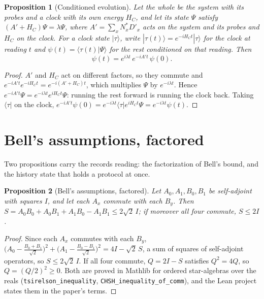 \documentclass[aps,prd,reprint,superscriptaddress]{revtex4-2}
\newtheorem{proposition}{Proposition}
\begin{document}
\begin{proposition}[Conditioned evolution]\label{prop:conditioned}
Let the whole be the system with its probes and a clock with its own energy $H_C$, and let its state $\Psi$ satisfy $(A' + H_C)\Psi = \lambda\Psi$, where $A' = \sum_x N^*_x D'_x$ acts on the system and its probes and $H_C$ on the clock. For a clock state $|\tau\rangle$, write $|\tau(t)\rangle = e^{-iH_C t}|\tau\rangle$ for the clock at reading $t$ and $\psi(t) = \langle \tau(t)|\Psi\rangle$ for the rest conditioned on that reading. Then
\begin{equation}
  \psi(t) = e^{i\lambda t}\, e^{-iA't}\, \psi(0).
  \label{eq:conditioned}
\end{equation}
\end{proposition}
\begin{proof}
$A'$ and $H_C$ act on different factors, so they commute and $e^{-iA't}e^{-iH_Ct} = e^{-i(A' + H_C)t}$, which multiplies $\Psi$ by $e^{-i\lambda t}$. Hence $e^{-iA't}\Psi = e^{-i\lambda t}e^{iH_Ct}\Psi$: running the rest forward is running the clock back. Taking $\langle\tau|$ on the clock, $e^{-iA't}\psi(0) = e^{-i\lambda t}\langle\tau|e^{iH_Ct}\Psi = e^{-i\lambda t}\psi(t)$.
\end{proof}

\section{Bell's assumptions, factored}
\label{app:bell}

Two propositions carry the records reading: the factorization of Bell's bound, and the history state that holds a protocol at once.

\begin{proposition}[Bell's assumptions, factored]\label{prop:factorization}
Let $A_0, A_1, B_0, B_1$ be self-adjoint with squares $I$, and let each $A_x$ commute with each $B_y$. Then $S = A_0B_0 + A_0B_1 + A_1B_0 - A_1B_1 \le 2\sqrt 2\, I$; if moreover all four commute, $S \le 2I$.
\end{proposition}
\begin{proof}
Since each $A_x$ commutes with each $B_y$, $\big(A_0 - \tfrac{B_0 + B_1}{\sqrt 2}\big)^2 + \big(A_1 - \tfrac{B_0 - B_1}{\sqrt 2}\big)^2 = 4I - \sqrt 2\, S$, a sum of squares of self-adjoint operators, so $S \le 2\sqrt 2\, I$. If all four commute, $Q = 2I - S$ satisfies $Q^2 = 4Q$, so $Q = (Q/2)^2 \ge 0$. Both are proved in Mathlib for ordered star-algebras over the reals (\texttt{tsirelson\_inequality}, \texttt{CHSH\_inequality\_of\_comm}), and the Lean project states them in the paper's terms.
\end{proof}
\end{document}
